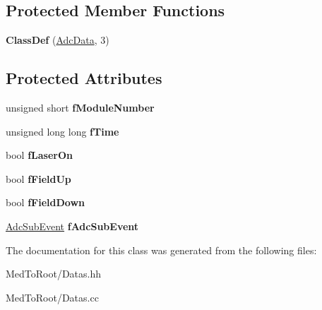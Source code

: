 \subsection*{Protected Member Functions}
\begin{DoxyCompactItemize}
\item 
\mbox{\label{class_adc_data_a812ff2254bbb02418d5926644eef19da}} 
{\bfseries Class\+Def} (\hyperlink{class_adc_data}{Adc\+Data}, 3)
\end{DoxyCompactItemize}
\subsection*{Protected Attributes}
\begin{DoxyCompactItemize}
\item 
\mbox{\label{class_adc_data_a028babb7bd1b50fa8838c92c492c6be7}} 
unsigned short {\bfseries f\+Module\+Number}
\item 
\mbox{\label{class_adc_data_a81a9a850671c20d546d98c8fb6689101}} 
unsigned long long {\bfseries f\+Time}
\item 
\mbox{\label{class_adc_data_a671528f3704f4f88de8dabc3e8c4a8de}} 
bool {\bfseries f\+Laser\+On}
\item 
\mbox{\label{class_adc_data_aa410ceb4615427d21169567727116bfa}} 
bool {\bfseries f\+Field\+Up}
\item 
\mbox{\label{class_adc_data_a921b19df1c84fcd656b7ed230f733529}} 
bool {\bfseries f\+Field\+Down}
\item 
\mbox{\label{class_adc_data_ae2c539ff0e3754c9089e3715904055ae}} 
\hyperlink{class_adc_sub_event}{Adc\+Sub\+Event} {\bfseries f\+Adc\+Sub\+Event}
\end{DoxyCompactItemize}


The documentation for this class was generated from the following files\+:\begin{DoxyCompactItemize}
\item 
Med\+To\+Root/Datas.\+hh\item 
Med\+To\+Root/Datas.\+cc\end{DoxyCompactItemize}
